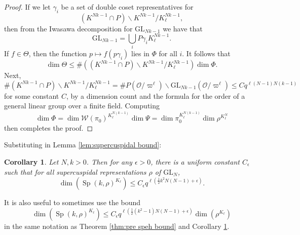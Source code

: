 \documentclass{amsart}
\newcommand{\lf}{\left}
\newcommand{\ri}{\right}
\newcommand{\f}{\frac}
\newcommand{\mc}[1]{\mathcal{#1}}
\newcommand{\GL}{\mathrm{GL}}
\newcommand{\eps}{\epsilon}
\newcommand{\bs}{\backslash}
\newcommand{\1}{\m 1}
\DeclareMathOperator{\Speh}{\mathrm{Sp}}
\newcommand{\dom}{\backslash}
\newtheorem{cor}[thm]{Corollary}
\theoremstyle{remark}
\theoremstyle{definition}
\numberwithin{equation}{subsection}
\newcommand{\blue}[1]{\textcolor{blue}{#1}}
\begin{document}
\begin{proof}
 If we let $\gamma_i$ be a set of double coset representatives for 
\[ 
(K^{Nk-1} \cap P) \dom K^{Nk-1}/K^{Nk-1}_\ell,  
\]
then from the Iwasawa decomposition for $\GL_{Nk-1}$ we have that 
\[
\GL_{Nk-1} = \bigcup_i P\gamma_iK^{Nk-1}_\ell.
\]
If $f \in \Theta$, then the function $p\mapsto f(p\gamma_i)$ lies in $\Phi$ for all $i$. It follows that 
\[ 
\dim \Theta \leq \#\lf((K^{Nk-1} \cap P)\dom K^{Nk-1}/K^{Nk-1}_\ell \ri) \dim \Phi. 
\] 
Next, 
\[
\#(K^{Nk-1} \cap P)\dom K^{Nk-1}/K^{Nk-1}_\ell = \#P(\mc O/\varpi^\ell) \bs \GL_{Nk-1}(\mc O/\varpi^\ell) \leq C q^{\ell(N-1)N(k-1)}
\]
for some constant $C$, by a dimension count and the formula for the order of a general linear group over a finite field. Computing
\[ 
\dim \Phi = \dim \mc W(\pi_0)^{K^{N(k-1)}_\ell} \dim \Psi = \dim \pi_0^{K^{N(k-1)}_\ell} \dim \rho^{K^N_\ell}
\] 
then completes the proof.
\end{proof}

Substituting in Lemma \ref{lem:supercuspidal bound}:

\begin{cor}\label{cor:speh bound}
Let $N,k > 0$. Then for any $\eps > 0$, there is a uniform constant $C_\eps$ such that for all supercuspidal representations $\rho$ of $\GL_N$, 
\[
\dim(\Speh(k, \rho)^{K_\ell}) \leq C_\eps q^{ \ell (\f12 k^2N(N-1) + \eps)}.
\]
\end{cor}


It is also useful to sometimes use the bound
\begin{equation}\label{eq:alt speh bound}
\dim(\Speh(k, \rho)^{K_\ell}) \leq C_\eps q^{\ell (\f12 (k^2-1)N(N-1) + \eps)} \dim(\rho^{K_\ell})    
\end{equation}
in the same notation as Theorem \ref{thm:pre speh bound} and Corollary \ref{cor:speh bound}. 


\end{document}
